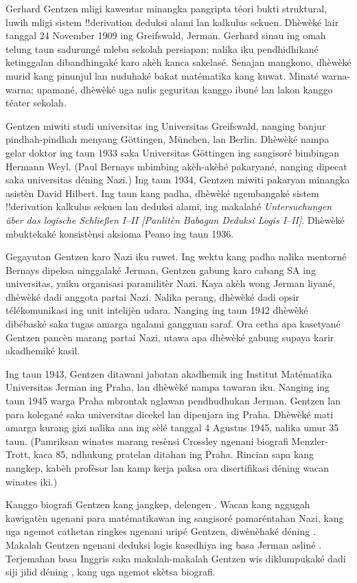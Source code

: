 \documentclass[../../../include/open-logic-section]{subfiles}
\begin{document}



Gerhard Gentzen mligi kawentar minangka pangripta téori
bukti struktural, luwih mligi sistem !!{derivation}
deduksi alami lan kalkulus sekuen. Dhèwèké lair
tanggal 24 November 1909 ing Greifswald, Jerman.
Gerhard sinau ing omah telung taun sadurungé mlebu
sekolah persiapan; nalika iku pendhidhikané ketinggalan
dibandhingaké karo akèh kanca sakelasé.
Senajan mangkono, dhèwèké murid kang pinunjul lan
nuduhaké bakat matématika kang kuwat. Minaté warna-warna;
upamané, dhèwèké uga nulis geguritan kanggo ibuné
lan lakon kanggo téater sekolah.

Gentzen miwiti studi universitas ing Universitas
Greifswald, nanging banjur pindhah-pindhah menyang
G\"{o}ttingen, München, lan Berlin. Dhèwèké nampa
gelar doktor ing taun 1933 saka Universitas G\"{o}ttingen
ing sangisoré bimbingan Hermann Weyl. (Paul Bernays
mbimbing akèh-akèhé pakaryané, nanging dipecat saka
universitas déning Nazi.) Ing taun 1934, Gentzen
miwiti pakaryan minangka asistèn David Hilbert.
Ing taun kang padha, dhèwèké ngembangaké sistem
!!{derivation} kalkulus sekuen lan deduksi alami,
ing makalahé \emph{Untersuchungen \"{u}ber das
logische Schlie\ss en I--II
  [Panlitèn Babagan Deduksi Logis I--II]}.
Dhèwèké mbuktekaké konsistènsi aksioma Peano
ing taun 1936.

Gegayutan Gentzen karo Nazi iku ruwet. Ing wektu
kang padha nalika mentorné Bernays dipeksa
ninggalaké Jerman, Gentzen gabung karo cabang
SA ing universitas, yaiku organisasi paramilitèr
Nazi. Kaya akèh wong Jerman liyané, dhèwèké
dadi anggota partai Nazi. Nalika perang,
dhèwèké dadi opsir télékomunikasi ing
unit intelijèn udara. Nanging ing taun 1942
dhèwèké dibébaské saka tugas amarga ngalami
gangguan saraf. Ora cetha apa kasetyané
Gentzen pancèn marang partai Nazi,
utawa apa dhèwèké gabung supaya karir
akadhemiké kasil.

Ing taun 1943, Gentzen ditawani jabatan
akadhemik ing Institut Matématika
Universitas Jerman ing Praha, lan
dhèwèké nampa tawaran iku. Nanging ing
taun 1945 warga Praha mbrontak nglawan
pendhudhukan Jerman. Gentzen lan para kolegané saka
universitas dicekel lan dipenjara
ing Praha.
Dhèwèké mati amarga kurang gizi nalika
ana ing sèlé tanggal 4 Agustus 1945,
nalika umur 35 taun.
(Pamriksan winates marang resènsi Crossley ngenani biografi Menzler-Trott, kaca 85, ndhukung pratelan ditahan ing Praha. Rincian sapa kang nangkep, kabèh profèsor lan kamp kerja paksa ora disertifikasi déning wacan winates iki.)

\begin{reading}
Kanggo biografi Gentzen kang jangkep, delengen
\citet{Menzler-Trott2007}. Wacan kang nggugah kawigatèn ngenani
para matématikawan ing sangisoré pamaréntahan
Nazi, kang uga ngemot cathetan ringkes ngenani
uripé Gentzen, diwènèhaké déning
\citet{Segal2014}. Makalah Gentzen ngenani
deduksi logis kasedhiya ing basa Jerman
asliné \citep{Gentzen1935a,Gentzen1935b}.
Terjemahan basa Inggris saka makalah-makalah
Gentzen wis diklumpukaké dadi siji jilid
déning \citet{Gentzen1969}, kang uga ngemot
skètsa biografi.
\end{reading}
\end{document}
